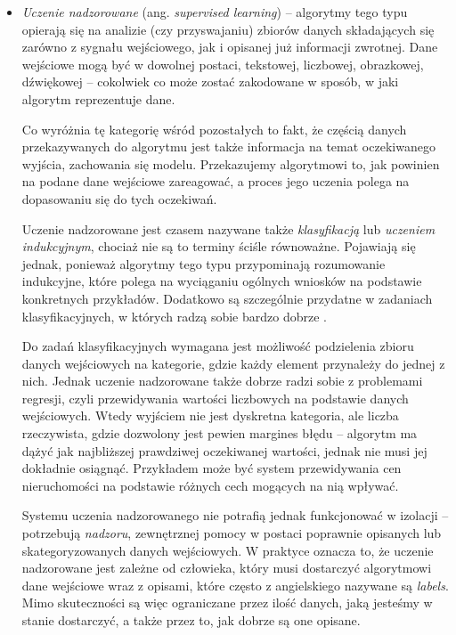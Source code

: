 \begin{itemize}

  \item \emph{Uczenie nadzorowane} (ang. \emph{supervised learning}) --
        algorytmy tego typu opierają się na analizie (czy przyswajaniu) zbiorów danych składających się zarówno z sygnału wejściowego, jak i opisanej już informacji zwrotnej.
        Dane wejściowe mogą być w dowolnej postaci, tekstowej, liczbowej, obrazkowej, dźwiękowej -- cokolwiek co może zostać zakodowane w sposób, w jaki algorytm reprezentuje dane.

        Co wyróżnia tę kategorię wśród pozostałych to fakt, że częścią danych przekazywanych do algorytmu jest także informacja na temat oczekiwanego wyjścia, zachowania się modelu.
        Przekazujemy algorytmowi to, jak powinien na podane dane wejściowe zareagować, a proces jego uczenia polega na dopasowaniu się do tych oczekiwań.

        Uczenie nadzorowane jest czasem nazywane także \emph{klasyfikacją} lub \emph{uczeniem indukcyjnym}, chociaż nie są to terminy ściśle równoważne.
        Pojawiają się jednak, ponieważ algorytmy tego typu przypominają rozumowanie indukcyjne, które polega na wyciąganiu ogólnych wniosków na podstawie konkretnych przykładów.
        Dodatkowo są szczególnie przydatne w zadaniach klasyfikacyjnych, w których radzą sobie bardzo dobrze \cite{hastie2009overview}.

        Do zadań klasyfikacyjnych wymagana jest możliwość podzielenia zbioru danych wejściowych na kategorie, gdzie każdy element przynależy do jednej z nich.
        Jednak uczenie nadzorowane także dobrze radzi sobie z problemami regresji, czyli przewidywania wartości liczbowych na podstawie danych wejściowych.
        Wtedy wyjściem nie jest dyskretna kategoria, ale liczba rzeczywista, gdzie dozwolony jest pewien margines błędu -- algorytm ma dążyć jak najbliższej prawdziwej oczekiwanej wartości, jednak nie musi jej dokładnie osiągnąć.
        Przykładem może być system przewidywania cen nieruchomości na podstawie różnych cech mogących na nią wpływać.

        Systemu uczenia nadzorowanego nie potrafią jednak funkcjonować w izolacji -- potrzebują \emph{nadzoru}, zewnętrznej pomocy w postaci poprawnie opisanych lub skategoryzowanych danych wejściowych.
        W praktyce oznacza to, że uczenie nadzorowane jest zależne od człowieka, który musi dostarczyć algorytmowi dane wejściowe wraz z opisami, które często z angielskiego nazywane są \emph{labels}.
        Mimo skuteczności są więc ograniczane przez ilość danych, jaką jesteśmy w stanie dostarczyć, a także przez to, jak dobrze są one opisane.


\end{itemize}
